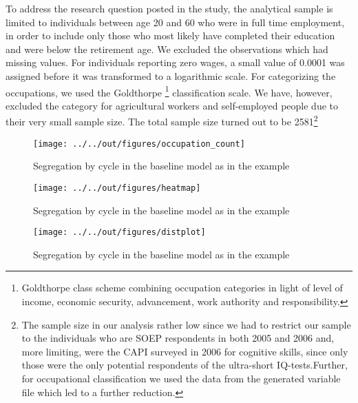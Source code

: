 \documentclass[11pt, a4paper, leqno]{article}
\begin{document}
To address the research question posted in the study, the analytical sample is limited to individuals between age 20 and 60  who were in full time employment, in order to include only those who most likely have completed their education and were below the retirement age. We excluded the observations which had missing values. For individuals reporting zero wages, a small value of 0.0001 was assigned before it was transformed to a logarithmic scale. For categorizing the occupations, we used the  Goldthorpe \footnote{ Goldthorpe class scheme combining occupation categories in light of level of income, economic security, advancement, work authority and responsibility.  
} classification scale.  We have, however,  excluded the category for  agricultural workers and self-employed people due to their very small sample size. The total sample size turned out to be 2581\footnote{The sample size in our analysis rather low since we had to restrict our sample to the  individuals who are SOEP respondents in both 2005 and 2006 and, more limiting, were the CAPI surveyed in 2006 for cognitive skills, since only those were the only potential respondents of the ultra-short IQ-tests.Further, for occupational classification we used the data from the generated variable file which led to a further reduction.}


\begin{figure}
    \caption{Segregation by cycle in the baseline \citet{Schelling69} model as in the \citet{StachurskiSargent13} example}
    
    \texttt{[image: ../../out/figures/occupation\_count]}

\end{figure}

\begin{figure}
    \caption{Segregation by cycle in the baseline \citet{Schelling69} model as in the \citet{StachurskiSargent13} example}
    
    \texttt{[image: ../../out/figures/heatmap]}

\end{figure}

\begin{figure}
    \caption{Segregation by cycle in the baseline \citet{Schelling69} model as in the \citet{StachurskiSargent13} example}
    
    \texttt{[image: ../../out/figures/distplot]}

\end{figure}







\printbibliography
{}





\end{document}
